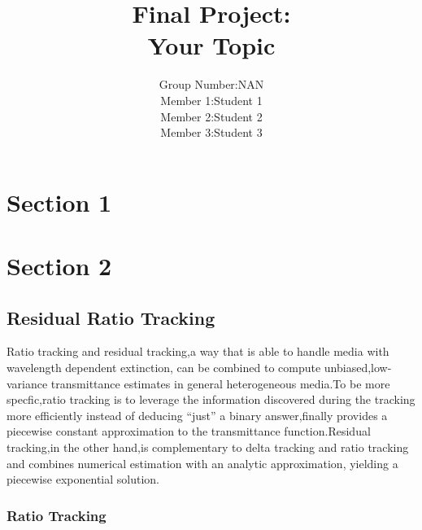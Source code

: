 \documentclass[acmtog]{acmart}
\title{Final Project:\\ {Your Topic}}
\author{
Group Number:\quad NAN \\
Member 1:\quad Student 1\\
Member 2:\quad Student 2\\
Member 3:\quad Student 3
}
\begin{document}
\maketitle

\vspace*{2 ex}

\section{Section 1}

\section{Section 2}
\subsection{Residual Ratio Tracking}
Ratio tracking and residual tracking,a way that is able to handle media with wavelength dependent extinction, can be combined to compute unbiased,low-variance transmittance estimates in general heterogeneous media.To be more specfic,ratio tracking is to leverage the information discovered during the tracking more efficiently instead of deducing “just” a binary answer,finally provides a piecewise constant approximation to the transmittance function.Residual tracking,in the other hand,is complementary to delta tracking and ratio tracking and combines numerical estimation with an analytic approximation, yielding a piecewise exponential solution.
\subsubsection{Ratio Tracking}
\end{document}
